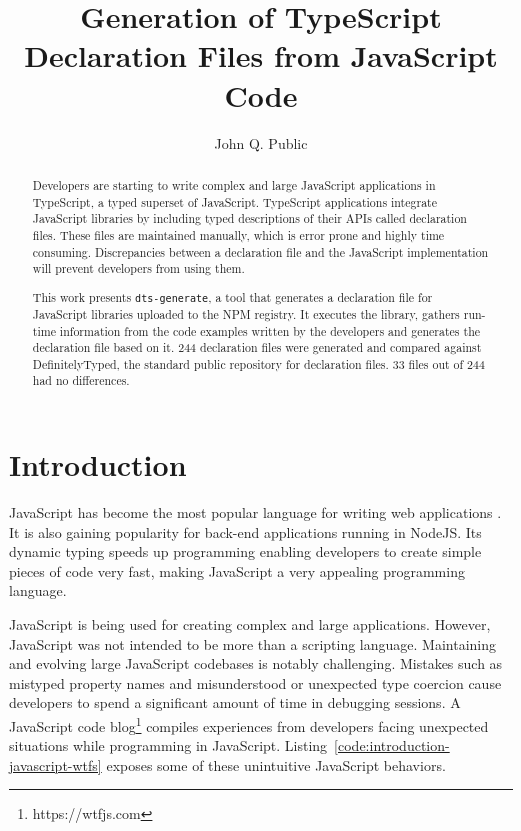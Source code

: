 \documentclass[a4paper,english,cleveref, autoref]{lipics-v2019}
\title{Generation of TypeScript Declaration Files from JavaScript Code}
\author{John Q. Public}{Dummy University Computing Laboratory, Country \and My second affiliation, Country \and \url{http://www.myhomepage.edu} }{johnqpublic@dummyuni.org}{https://orcid.org/0000-0002-1825-0097}{(Optional) author-specific funding acknowledgements}%
\newcommand{\coderef}[1]{Listing~\ref{#1}}
\begin{document}
\maketitle

\begin{abstract}
Developers are starting to write complex and large JavaScript applications in TypeScript, a typed superset of JavaScript. TypeScript applications integrate JavaScript libraries by including typed descriptions of their APIs called declaration files. These files are maintained manually, which is error prone and highly time consuming. Discrepancies between a declaration file and the JavaScript implementation will prevent developers from using them.

This work presents \lstinline{dts-generate}, a tool that generates a declaration file for JavaScript libraries uploaded to the NPM registry. It executes the library, gathers run-time information from the code examples written by the developers and generates the declaration file based on it. 244 declaration files were generated and compared against DefinitelyTyped, the standard public repository for declaration files. 33 files out of 244 had no differences.
\end{abstract}

\section{Introduction}
JavaScript has become the most popular language for writing web applications \cite{github-statistics}. It is also gaining popularity for back-end applications running in NodeJS. Its dynamic typing speeds up programming enabling developers to create simple pieces of code very fast, making JavaScript a very appealing programming language.

JavaScript is being used for creating complex and large applications. However, JavaScript was not intended to be more than a scripting language. Maintaining and evolving large JavaScript codebases is notably challenging. Mistakes such as mistyped property names and misunderstood or unexpected type coercion cause developers to spend a significant amount of time in debugging sessions. A JavaScript code blog\footnote{https://wtfjs.com} compiles experiences from developers facing unexpected situations while programming in JavaScript. \coderef{code:introduction-javascript-wtfs} exposes some of these unintuitive JavaScript behaviors.
\end{document}
